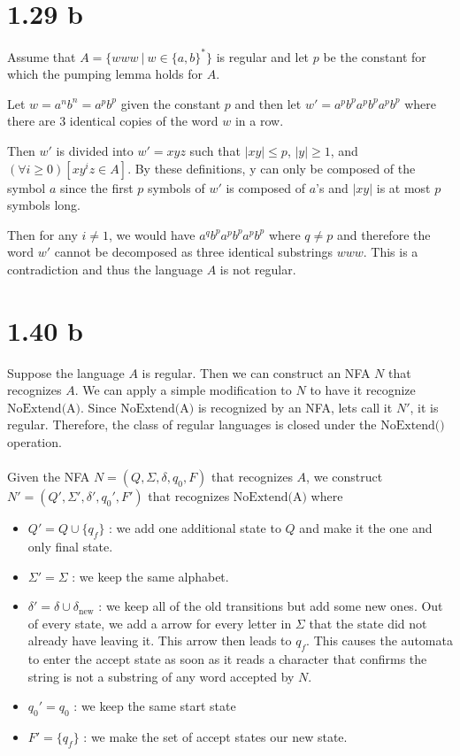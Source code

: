 \documentclass{article}
\begin{document}
\section*{1.29 b}

\quad Assume that $A = \{www \:|\: w \in \{a, b\}^*\}$ is regular and let $p$ be the constant for which the pumping lemma holds for $A$.

\vspace{5mm} 

Let $w = a^nb^n = a^pb^p$ given the constant $p$ and then let $w' = a^pb^pa^pb^pa^pb^p$ where there are 3 identical copies of the word $w$ in a row.

\vspace{5mm} 

Then $w'$ is divided into $w' = xyz$ such that $|xy| \leq p$, $|y| \geq 1$, and $(\forall i \geq 0)[xy^iz \in A]$. By these definitions, y can only be composed of the symbol $a$ since the first $p$ symbols of $w'$ is composed of $a$'s and $|xy|$ is at most $p$ symbols long.

\vspace{5mm}

Then for any $i \neq 1$, we would have $a^qb^pa^pb^pa^pb^p$ where $ q \neq p$ and therefore the word $w'$ cannot be decomposed as three identical substrings $www$. This is a contradiction and thus the language $A$ is not regular.

\section*{1.40 b}

Suppose the language $A$ is regular. Then we can construct an NFA $N$ that recognizes $A$. We can apply a simple modification to $N$ to have it recognize $\textrm{NoExtend(A)}$. Since $\textrm{NoExtend(A)}$ is recognized by an NFA, lets call it $N'$, it is regular. Therefore, the class of regular languages is closed under the $\textrm{NoExtend()}$ operation.\\\\
Given the NFA $N = (Q, \Sigma, \delta, q_0, F)$ that recognizes $A$, we construct $N' = (Q', \Sigma', \delta', q_0', F')$ that recognizes $\textrm{NoExtend(A)}$ where 
\begin{itemize}
    \item $Q' = Q \cup \{q_f\}$ : we add one additional state to $Q$ and make it the one and only final state.
    \item $\Sigma' = \Sigma$ : we keep the same alphabet.
    \item $\delta' = \delta \cup \delta_\textrm{new}$ : we keep all of the old transitions but add some new ones. Out of every state, we add a arrow for every letter in $\Sigma$ that the state did not already have leaving it. This arrow then leads to $q_f$. This causes the automata to enter the accept state as soon as it reads a character that confirms the string is not a substring of any word accepted by $N$.
    \item $q_0' = q_0$ : we keep the same start state
    \item $F' = \{q_f\}$ : we make the set of accept states our new state.
\end{itemize}
\end{document}
